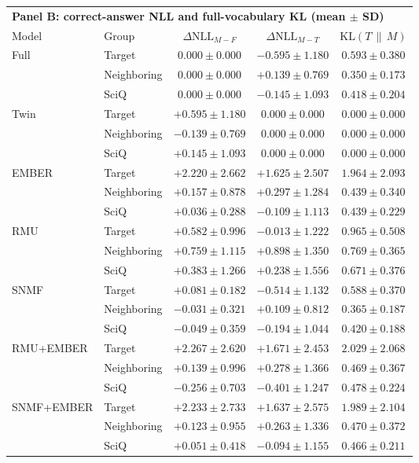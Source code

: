 \begin{table}[t]
  \vspace{1em}
  \begin{tabular}{llccc}
    \toprule
    \multicolumn{5}{l}{\textbf{Panel B: correct-answer NLL and full-vocabulary KL (mean $\pm$ SD)}} \\
    \cmidrule(lr){1-5}
    Model & Group & $\Delta\mathrm{NLL}_{M-F}$ & $\Delta\mathrm{NLL}_{M-T}$ & $\mathrm{KL}(T\,\|\,M)$ \\
    \midrule
    Full  & Target      & $0.000 \pm 0.000$ & $-0.595 \pm 1.180$ & $0.593 \pm 0.380$ \\
          & Neighboring & $0.000 \pm 0.000$ & $+0.139 \pm 0.769$ & $0.350 \pm 0.173$ \\
          & SciQ        & $0.000 \pm 0.000$ & $-0.145 \pm 1.093$ & $0.418 \pm 0.204$ \\
    Twin  & Target      & $+0.595 \pm 1.180$ & $0.000 \pm 0.000$ & $0.000 \pm 0.000$ \\
          & Neighboring & $-0.139 \pm 0.769$ & $0.000 \pm 0.000$ & $0.000 \pm 0.000$ \\
          & SciQ        & $+0.145 \pm 1.093$ & $0.000 \pm 0.000$ & $0.000 \pm 0.000$ \\
    EMBER & Target      & $+2.220 \pm 2.662$ & $+1.625 \pm 2.507$ & $1.964 \pm 2.093$ \\
          & Neighboring & $+0.157 \pm 0.878$ & $+0.297 \pm 1.284$ & $0.439 \pm 0.340$ \\
          & SciQ        & $\mathbf{+0.036 \pm 0.288}$ & $-0.109 \pm 1.113$ & $0.439 \pm 0.229$ \\
    RMU   & Target      & $+0.582 \pm 0.996$ & $\mathbf{-0.013 \pm 1.222}$ & $0.965 \pm 0.508$ \\
          & Neighboring & $+0.759 \pm 1.115$ & $+0.898 \pm 1.350$ & $0.769 \pm 0.365$ \\
          & SciQ        & $+0.383 \pm 1.266$ & $+0.238 \pm 1.556$ & $0.671 \pm 0.376$ \\
    SNMF  & Target      & $+0.081 \pm 0.182$ & $-0.514 \pm 1.132$ & $\mathbf{0.588 \pm 0.370}$ \\
          & Neighboring & $\mathbf{-0.031 \pm 0.321}$ & $\mathbf{+0.109 \pm 0.812}$ & $\mathbf{0.365 \pm 0.187}$ \\
          & SciQ        & $-0.049 \pm 0.359$ & $-0.194 \pm 1.044$ & $\mathbf{0.420 \pm 0.188}$ \\
    RMU+EMBER & Target      & $\mathbf{+2.267 \pm 2.620}$ & $+1.671 \pm 2.453$ & $2.029 \pm 2.068$ \\
          & Neighboring & $+0.139 \pm 0.996$ & $+0.278 \pm 1.366$ & $0.469 \pm 0.367$ \\
          & SciQ        & $-0.256 \pm 0.703$ & $-0.401 \pm 1.247$ & $0.478 \pm 0.224$ \\
    SNMF+EMBER & Target      & $+2.233 \pm 2.733$ & $+1.637 \pm 2.575$ & $1.989 \pm 2.104$ \\
          & Neighboring & $+0.123 \pm 0.955$ & $+0.263 \pm 1.336$ & $0.470 \pm 0.372$ \\
          & SciQ        & $+0.051 \pm 0.418$ & $\mathbf{-0.094 \pm 1.155}$ & $0.466 \pm 0.211$ \\
    \bottomrule
  \end{tabular}


\end{table}
